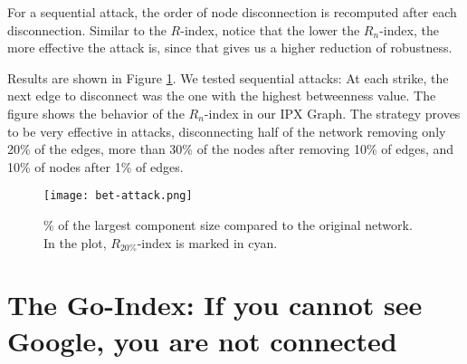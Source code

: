\documentclass{sig-alternate-10pt}
\begin{document}
For a sequential attack, the order of node disconnection is recomputed after each disconnection. Similar to the $R$-index, notice that the lower the $R_n$-index, the more effective the attack is, since that gives us a higher reduction of robustness. 

Results are shown in Figure \ref{fig:bet-attack}. We tested sequential attacks: At each strike, the next edge to disconnect was the one with the highest betweenness value.  The figure shows the behavior of the $R_n$-index in our IPX Graph. The strategy proves to be very effective in attacks, disconnecting half of the network removing only 20\% of the edges, more than 30\% of the nodes after removing 10\% of edges, and 10\% of nodes after 1\% of edges.


\begin{figure}[th!]
  \centering
  \texttt{[image: bet-attack.png]}
  \caption{\% of the largest component size compared to the original network. In the plot, $R_{20\%}$-index is marked in cyan.}
  \label{fig:bet-attack}
\end{figure}

\section{The Go-Index: If you cannot see Google, you are not connected}
\label{go}
\end{document}
